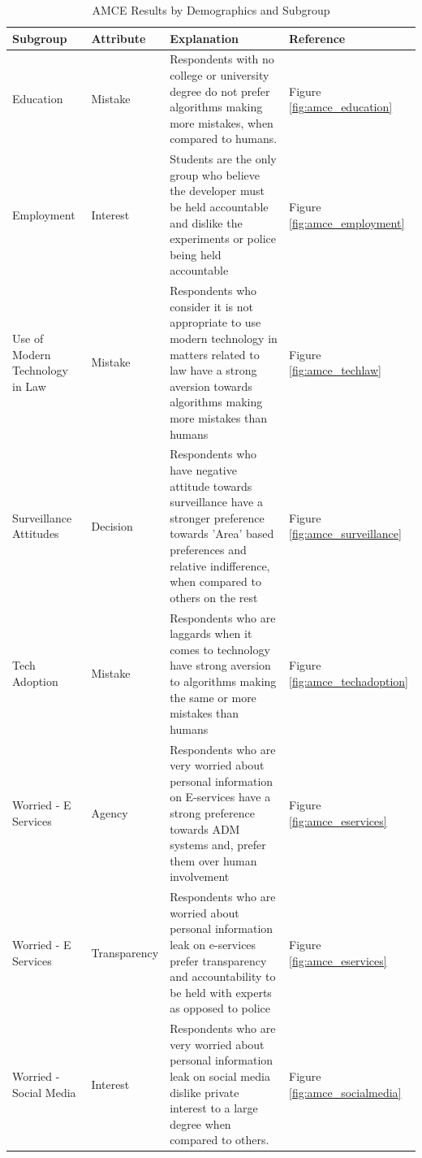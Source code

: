 \begin{table}[H]
\centering
\begin{tabular}{p{3cm} p{3cm} p{8cm} p{2cm}}
\toprule
\textbf{Subgroup} & \textbf{Attribute} & \textbf{Explanation} & \textbf{Reference} \\
\midrule
Education & Mistake & Respondents with no college or university degree do not prefer algorithms making more mistakes, when compared to humans. & Figure \ref{fig:amce_education} \\[1em]
\midrule
Employment & Interest & Students are the only group who believe the developer must be held accountable and dislike the experiments or police being held accountable & Figure \ref{fig:amce_employment} \\[1em]
\midrule
Use of Modern Technology in Law& Mistake & Respondents who consider it is not appropriate to use modern technology in matters related to law have a strong aversion towards algorithms making more mistakes than humans& Figure \ref{fig:amce_techlaw} \\[1em]
\midrule
Surveillance Attitudes  & Decision & Respondents who have negative attitude towards surveillance have a stronger preference towards 'Area' based preferences and relative indifference, when compared to others on the rest    & Figure 
\ref{fig:amce_surveillance} \\[1em]
\midrule
Tech Adoption & Mistake & Respondents who are laggards when it comes to technology have strong aversion to algorithms making the same or more mistakes than humans & Figure \ref{fig:amce_techadoption} \\[1em]
\midrule

Worried - E Services & Agency & Respondents who are very worried about personal information on E-services have a strong preference towards ADM systems and, prefer them over human involvement  & Figure \ref{fig:amce_eservices} \\[1em]

\midrule
Worried - E Services & Transparency & Respondents who are worried about personal information leak on e-services prefer transparency and accountability to be held with experts as opposed to police  & Figure \ref{fig:amce_eservices} \\[1em]
\midrule

Worried - Social Media & Interest & Respondents who are very worried about personal information leak on social media dislike private interest to a large degree when compared to others.  & Figure \ref{fig:amce_socialmedia} \\[1em]
\bottomrule
\end{tabular}
\caption{AMCE Results by Demographics and Subgroup}
\label{tab:subgroup1}
\end{table}